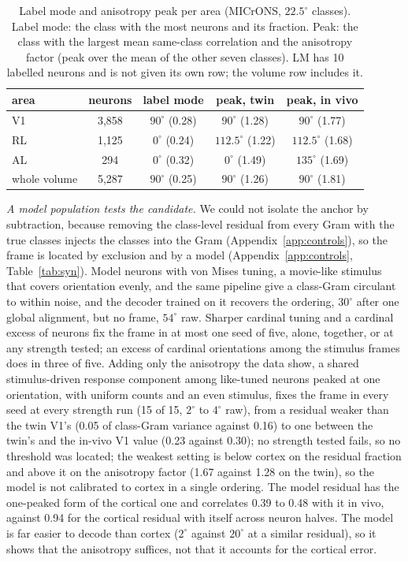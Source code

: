 \documentclass[11pt]{article}
\begin{document}
\begin{table}[htbp]
  \centering\footnotesize
  \caption{Label mode and anisotropy peak per area (MICrONS, $22.5^\circ$ classes). Label mode: the class with the most neurons and its fraction. Peak: the class with the largest mean same-class correlation and the anisotropy factor (peak over the mean of the other seven classes). LM has 10 labelled neurons and is not given its own row; the volume row includes it.}
  \label{tab:areas}
  \begin{tabular}{lcccc}
    \toprule
    area & neurons & label mode & peak, twin & peak, in vivo \\
    \midrule
    V1 & 3,858 & $90^\circ$ (0.28) & $90^\circ$ (1.28) & $90^\circ$ (1.77) \\
    RL & 1,125 & $0^\circ$ (0.24) & $112.5^\circ$ (1.22) & $112.5^\circ$ (1.68) \\
    AL & 294 & $0^\circ$ (0.32) & $0^\circ$ (1.49) & $135^\circ$ (1.69) \\
    whole volume & 5,287 & $90^\circ$ (0.25) & $90^\circ$ (1.26) & $90^\circ$ (1.81) \\
    \bottomrule
  \end{tabular}
\end{table}

\emph{A model population tests the candidate.} We could not isolate the anchor by subtraction, because removing the class-level residual from every Gram with the true classes injects the classes into the Gram (Appendix~\ref{app:controls}), so the frame is located by exclusion and by a model (Appendix~\ref{app:controls}, Table~\ref{tab:syn}). Model neurons with von Mises tuning, a movie-like stimulus that covers orientation evenly, and the same pipeline give a class-Gram circulant to within noise, and the decoder trained on it recovers the ordering, $30^\circ$ after one global alignment, but no frame, $54^\circ$ raw. Sharper cardinal tuning and a cardinal excess of neurons fix the frame in at most one seed of five, alone, together, or at any strength tested; an excess of cardinal orientations among the stimulus frames does in three of five. Adding only the anisotropy the data show, a shared stimulus-driven response component among like-tuned neurons peaked at one orientation, with uniform counts and an even stimulus, fixes the frame in every seed at every strength run (15 of 15, $2^\circ$ to $4^\circ$ raw), from a residual weaker than the twin V1's (0.05 of class-Gram variance against 0.16) to one between the twin's and the in-vivo V1 value (0.23 against 0.30); no strength tested fails, so no threshold was located; the weakest setting is below cortex on the residual fraction and above it on the anisotropy factor (1.67 against 1.28 on the twin), so the model is not calibrated to cortex in a single ordering. The model residual has the one-peaked form of the cortical one and correlates 0.39 to 0.48 with it in vivo, against 0.94 for the cortical residual with itself across neuron halves. The model is far easier to decode than cortex ($2^\circ$ against $20^\circ$ at a similar residual), so it shows that the anisotropy suffices, not that it accounts for the cortical error.
\end{document}
